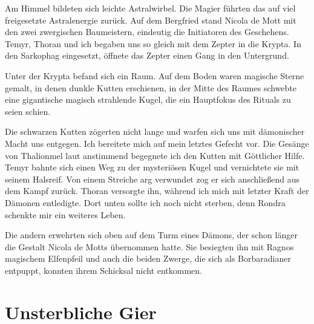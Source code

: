 \documentclass[11pt]{scrreprt}
\begin{document}
Am Himmel bildeten sich leichte Astralwirbel. Die Magier führten das auf viel freigesetzte Astralenergie zurück. Auf dem Bergfried stand Nicola de Mott mit den zwei zwergischen Baumeistern, eindeutig die Initiatoren des Geschehens. Temyr, Thoran und ich begaben uns so gleich mit dem Zepter in die Krypta. In den Sarkophag eingesetzt, öffnete das Zepter einen Gang in den Untergrund.\par
Unter der Krypta befand sich ein Raum. Auf dem Boden waren magische Sterne gemalt, in denen dunkle Kutten erschienen, in der Mitte des Raumes schwebte eine gigantische magisch strahlende Kugel, die ein Hauptfokus des Rituals zu seien schien.\par
Die schwarzen Kutten zögerten nicht lange und warfen sich uns mit dämonischer Macht uns entgegen. Ich bereitete mich auf mein letztes Gefecht vor. Die Gesänge von Thalionmel laut anstimmend begegnete ich den Kutten mit Göttlicher Hilfe. Temyr bahnte sich einen Weg zu der mysteriösen Kugel und vernichtete sie mit seinem Halsreif. Von einem Streiche arg verwundet zog er sich anschließend aus dem Kampf zurück. Thoran versorgte ihn, während ich mich mit letzter Kraft der Dämonen entledigte. Dort unten sollte ich noch nicht sterben, denn Rondra schenkte mir ein weiteres Leben.\par
Die andern erwehrten sich oben auf dem Turm eines Dämons, der schon länger die Gestalt Nicola de Motts übernommen hatte. Sie besiegten ihn mit Ragnos magischem Elfenpfeil und auch die beiden Zwerge, die sich als Borbaradianer entpuppt, konnten ihrem Schicksal nicht entkommen. \par


\chapter{Unsterbliche Gier}
\end{document}
